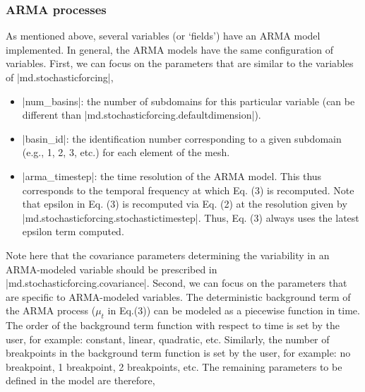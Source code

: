 \subsubsection{ARMA processes} %
As mentioned above, several variables (or `fields') have an ARMA model implemented. In general, the ARMA models have the same configuration of variables. First, we can focus on the parameters that are similar to the variables of \lstinlinebg|md.stochasticforcing|,
\begin{itemize}
	\item \lstinlinebg|num_basins|: the number of subdomains for this particular variable (can be different than \lstinlinebg|md.stochasticforcing.defaultdimension|).
	\item \lstinlinebg|basin_id|: the identification number corresponding to a given subdomain (e.g., 1, 2, 3, etc.) for each element of the mesh.
	\item \lstinlinebg|arma_timestep|: the time resolution of the ARMA model. This thus corresponds to the temporal frequency at which Eq. (3) is recomputed. Note that epsilon in Eq. (3) is recomputed via Eq. (2) at the resolution given by \lstinlinebg|md.stochasticforcing.stochastictimestep|. Thus, Eq. (3) always uses the latest epsilon term computed. 
\end{itemize}
Note here that the covariance parameters determining the variability in an ARMA-modeled variable should be prescribed in \lstinlinebg|md.stochasticforcing.covariance|.
Second, we can focus on the parameters that are specific to ARMA-modeled variables. The deterministic background term of the ARMA process ($\mu_{t}$ in Eq.(3)) can be modeled as a piecewise function in time. The order of the background term function with respect to time is set by the user, for example: constant, linear, quadratic, etc. Similarly, the number of breakpoints in the background term function is set by the user, for example: no breakpoint, 1 breakpoint, 2 breakpoints, etc. The remaining parameters to be defined in the model are therefore,
